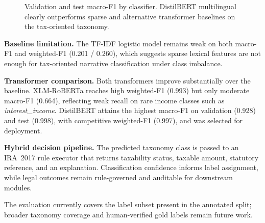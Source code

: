 \documentclass[conference]{IEEEtran}
\begin{document}
\begin{figure}[!htbp]
\centering
{}
\caption{Validation and test macro-F1 by classifier. DistilBERT multilingual clearly outperforms sparse and alternative transformer baselines on the tax-oriented taxonomy.}
\label{fig:txn_f1_bars}
\end{figure}

\textbf{Baseline limitation.} The TF-IDF logistic model remains weak on both macro-F1 and weighted-F1 (0.201 / 0.260), which suggests sparse lexical features are not enough for tax-oriented narrative classification under class imbalance.

\textbf{Transformer comparison.} Both transformers improve substantially over the baseline. XLM-RoBERTa reaches high weighted-F1 (0.993) but only moderate macro-F1 (0.664), reflecting weak recall on rare income classes such as \textit{interest\_income}. DistilBERT attains the highest macro-F1 on validation (0.928) and test (0.998), with competitive weighted-F1 (0.997), and was selected for deployment.

\textbf{Hybrid decision pipeline.} The predicted taxonomy class is passed to an IRA~2017 rule executor that returns taxability status, taxable amount, statutory reference, and an explanation. Classification confidence informs label assignment, while legal outcomes remain rule-governed and auditable for downstream modules.

The evaluation currently covers the label subset present in the annotated split; broader taxonomy coverage and human-verified gold labels remain future work.
\end{document}
